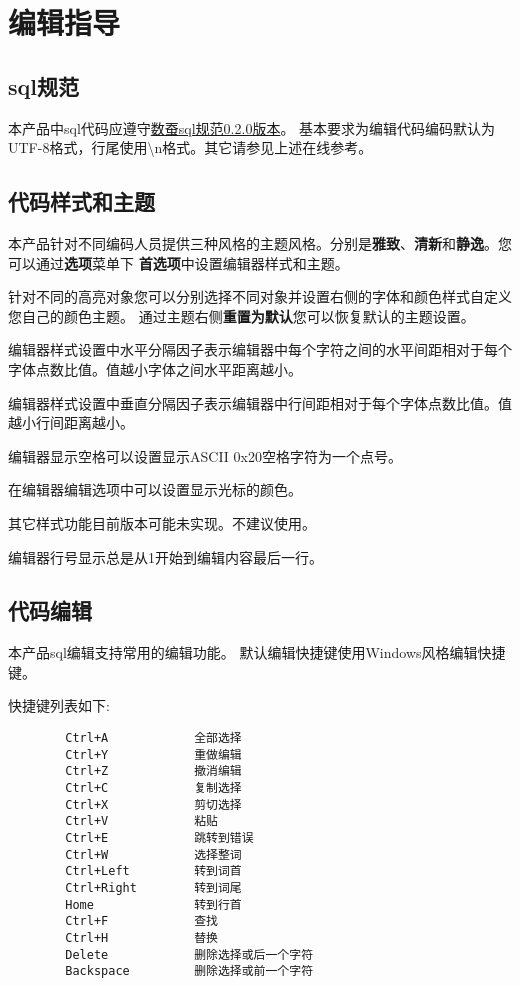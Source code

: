 \section{编辑指导}\label{edit}

\linespread{1.2}
\large
\subsection{sql规范}
本产品中sql代码应遵守\href{http://www.shucantech.com/zh/sql_ref_0.2.0.html}{数蚕sql规范0.2.0版本}。
基本要求为编辑代码编码默认为UTF-8格式，行尾使用\textbackslash n格式。其它请参见上述在线参考。

\subsection{代码样式和主题}
\bigskip

本产品针对不同编码人员提供三种风格的主题风格。分别是\textbf{雅致}、\textbf{清新}和\textbf{静逸}。您可以通过\textbf{选项}菜单下
\textbf{首选项}中设置编辑器样式和主题。

针对不同的高亮对象您可以分别选择不同对象并设置右侧的字体和颜色样式自定义您自己的颜色主题。
通过主题右侧\textbf{重置为默认}您可以恢复默认的主题设置。

编辑器样式设置中水平分隔因子表示编辑器中每个字符之间的水平间距相对于每个字体点数比值。值越小字体之间水平距离越小。

编辑器样式设置中垂直分隔因子表示编辑器中行间距相对于每个字体点数比值。值越小行间距离越小。

编辑器显示空格可以设置显示ASCII 0x20空格字符为一个点号。

在编辑器编辑选项中可以设置显示光标的颜色。

其它样式功能目前版本可能未实现。不建议使用。

编辑器行号显示总是从1开始到编辑内容最后一行。

\subsection{代码编辑}
\bigskip

本产品sql编辑支持常用的编辑功能。
默认编辑快捷键使用Windows风格编辑快捷键。

快捷键列表如下:\\
\begin{verbatim}
        Ctrl+A            全部选择
        Ctrl+Y            重做编辑
        Ctrl+Z            撤消编辑
        Ctrl+C            复制选择
        Ctrl+X            剪切选择
        Ctrl+V            粘贴
        Ctrl+E            跳转到错误
        Ctrl+W            选择整词
        Ctrl+Left         转到词首
        Ctrl+Right        转到词尾
        Home              转到行首
        Ctrl+F            查找
        Ctrl+H            替换
        Delete            删除选择或后一个字符
        Backspace         删除选择或前一个字符

\end{verbatim}

